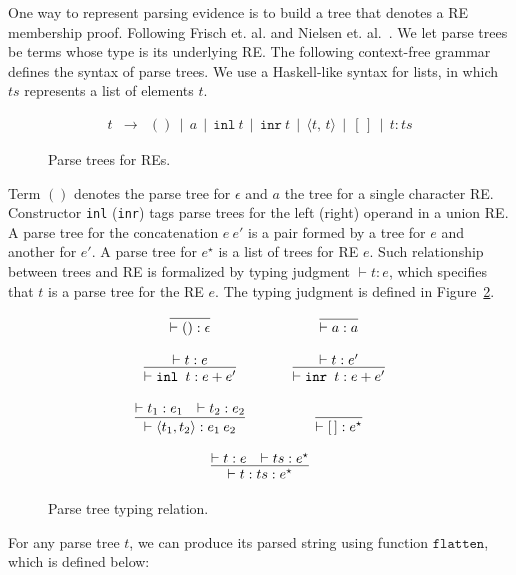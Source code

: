 \documentclass[oneside,12pt]{scrbook}
\theoremstyle{definition}
\newcommand{\flatten}{\ensuremath{\texttt{flatten}}}
\theoremstyle{plain}
\theoremstyle{definition}
\begin{document}
One way to represent parsing evidence is to build a tree that denotes
a RE membership proof. Following Frisch et. al. \cite{Frisch2004} and Nielsen et.
al.~\cite{Lasse2011}. We let parse trees be terms whose type is its underlying RE. The following context-free 
grammar defines the syntax of parse trees. We use a Haskell-like syntax for 
lists, in which $ts$ represents a list of elements $t$.

\begin{figure}[h]
	\[
	\begin{array}{lcl}
	t & \to & () \,\mid\, a \,\mid\, \texttt{inl}\:t  \,\mid\, \texttt{inr}\:t  \,\mid\, \langle t,\,t\rangle  \,\mid\, [\,]\,\mid\,t : ts
	\end{array}
	\]
	\caption{Parse trees for REs.}
	\label{figure:parsetreesyntax}
\end{figure}

Term $()$ denotes the parse tree for $\epsilon$ and $a$ the tree for a single character RE. 
Constructor \texttt{inl} (\texttt{inr}) tags parse trees for the left (right) operand in 
a union RE. A parse tree for the concatenation $e\:e'$ is a pair formed by a tree for $e$ and 
another for $e'$. A parse tree for $e^\star$ is a list of trees for RE $e$. Such relationship 
between trees and RE is formalized by typing judgment $\vdash t : e$, which specifies that 
$t$ is a parse tree for the RE $e$. The typing judgment is defined in Figure~\ref{figure:parsetreetyping}.


\begin{figure}[h]
	\[ 
	\begin{array}{ccc}
	\infer{\vdash () : \epsilon}{} & \hspace{.5cm} & \infer{\vdash a : a}{}\\
	\\
	\infer{\vdash \texttt{inl }t : e + e'}{\vdash t : e}  & & 
	\infer{\vdash \texttt{inr }t : e + e'}{\vdash t : e'} \\ 
	\\
	\infer{\vdash \langle t_1, t_2 \rangle : e_1\:e_2}
	{\vdash t_1 : e_1 & \vdash t_2 : e_2}   & & 
	\infer{\vdash [\,] : e^\star}{} \\ \\
	\multicolumn{3}{c}{
		\infer{\vdash t : ts : e ^\star}
		{\vdash t : e & \vdash ts : e ^\star}
	}
	\end{array}
	\]
	\caption{Parse tree typing relation.}
	\label{figure:parsetreetyping}
\end{figure}


For any parse tree $t$, we can produce its parsed string using function 
\flatten, which is defined below:
\end{document}
